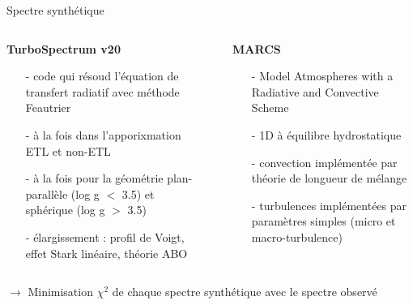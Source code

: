 \documentclass[10pt]{beamer}
\begin{document}
\begin{frame}[fragile]{Spectre synthétique}
    \begin{columns}
        \begin{column}{0.52\textwidth}
            \begin{center}
                \textbf{TurboSpectrum v20}  
                \begin{itemize}
                    \item [-] code qui résoud l'équation de transfert radiatif avec méthode Feautrier
                    \item [-] à la fois dans l'apporixmation ETL et non-ETL
                    \item [-] à la fois pour la géométrie plan-parallèle (log g $<$ 3.5) et sphérique (log g $>$ 3.5)
                    \item [-] élargissement : profil de Voigt, effet Stark linéaire, théorie ABO
                \end{itemize}
            \end{center}
        \end{column}
        \begin{column}{0.04\textwidth}
        \end{column}
        \begin{column}{0.44\textwidth}
            \begin{center}
                \textbf{MARCS}
               \begin{itemize}
                \item [-] Model Atmospheres with a Radiative and Convective Scheme
                \item [-] 1D à équilibre hydrostatique
                \item [-] convection implémentée par théorie de longueur de mélange
                \item [-] turbulences implémentées par paramètres simples (micro et macro-turbulence)
               \end{itemize}
            \end{center}
        \end{column}
\end{columns}
\vfill 
$\rightarrow$ Minimisation $\chi^2$ de chaque spectre synthétique avec le spectre observé
\end{frame}
\end{document}
